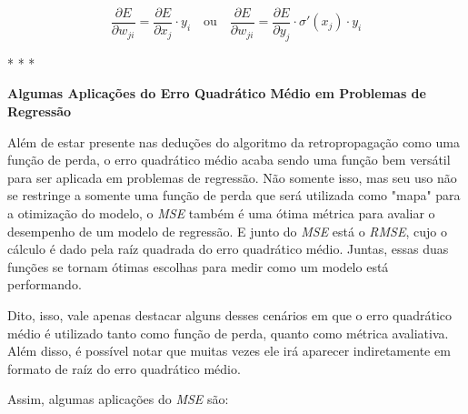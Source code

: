 \begin{equation}
    \frac{\partial E}{\partial w_{ji}} = \frac{\partial E}{\partial x_j} \cdot y_i \quad \text{ou} \quad \frac{\partial E}{\partial w_{ji}} = \frac{\partial E}{\partial y_j} \cdot \sigma'(x_j) \cdot y_i
    \label{eq:gradiente-do-erro-em-relacao-a-um-peso-de-um-neuronio-perda-regressao}
\end{equation}

\medskip
\begin{center}
 * * *
\end{center}
\medskip

\textbf{Algumas Aplicações do Erro Quadrático Médio em Problemas de Regressão} 
\vspace{1em}

Além de estar presente nas deduções do algoritmo da retropropagação como uma função de perda, o erro quadrático médio acaba sendo uma função bem versátil para ser aplicada em problemas de regressão. Não somente isso, mas seu uso não se restringe a somente uma função de perda que será utilizada como "mapa" para a otimização do modelo, o \textit{MSE} também é uma ótima métrica para avaliar o desempenho de um modelo de regressão. E junto do \textit{MSE} está o \textit{RMSE}, cujo o cálculo é dado pela raíz quadrada do erro quadrático médio. Juntas, essas duas funções se tornam ótimas escolhas para medir como um modelo está performando.

Dito, isso, vale apenas destacar alguns desses cenários em que o erro quadrático médio é utilizado tanto como função de perda, quanto como métrica avaliativa. Além disso, é possível notar que muitas vezes ele irá aparecer indiretamente em formato de raíz do erro quadrático médio.

Assim, algumas aplicações do \textit{MSE} são:

